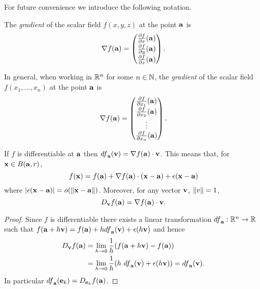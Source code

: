 For future convenience we introduce the following notation.
%
\begin{definition}[gradient]
    The \emph{gradient} of the scalar field \(f(x,y,z)\) at the point \(\aa\) is
    \[
        \nabla f(\aa) =
        \begin{pmatrix}
            \frac{\partial f}{\partial x}(\aa) \\[2pt]
            \frac{\partial f}{\partial y}(\aa) \\[2pt]
            \frac{\partial f}{\partial z}(\aa)
        \end{pmatrix}.
    \]
\end{definition}
%
\noindent
In general, when working in \(\bR^n\) for some \(n\in\bN\), the \emph{gradient} of the scalar field \(f(x_1,\ldots,x_n)\) at the point \(\aa\) is
\[
    \nabla f(\aa) =
    \begin{pmatrix}
        \frac{\partial f}{\partial x_1}(\aa) \\[2pt]
        \frac{\partial f}{\partial x_2}(\aa) \\[2pt]
        \vdots                               \\
        \frac{\partial f}{\partial x_n}(\aa)
    \end{pmatrix}.
\]


\begin{theorem}%
    \label{thm:differential}
    If \(f\) is differentiable at \(\aa\)
    then \({df}_{\aa}(\vv) = \nabla f(\aa) \cdot \vv \).
    This means that, for \(\xx \in B(\aa,r)\),
    \[
        f(\xx) = f(\aa) +   \nabla f(\aa) \cdot (\xx-\aa) + \epsilon(\xx-\aa)
    \]
    where \(\abs{\epsilon(\xx-\aa)} = \littleo{\norm{\xx-\aa}}\).
    Moreover, for any vector \(\vv\), \(\norm{v}=1\),
    \[
        D_{\vv}f(\aa) = \nabla f(\aa) \cdot \vv.
    \]
\end{theorem}

\begin{proof}
    Since \(f\) is differentiable there exists a linear transformation \({df}_{\aa}: \bR^n \to \bR\) such that
    \(  f(\aa+ h \vv) = f(\aa) + h {df}_{\aa}(\vv) + \epsilon(h\vv)\)
    and hence
    \[
        \begin{aligned}
            D_{\vv}f(\aa) & =
            \lim_{h\to 0} \frac{1}{h}(f(\aa+h \vv) - f(\aa)) \\
                          & =
            \lim_{h\to 0} \frac{1}{h}(h \ {df}_{\aa}(\vv) + \epsilon(h\vv) )
            =  {df}_{\aa}(\vv).
        \end{aligned}
    \]
    In particular \({df}_{\aa}(\ee_k) = D_{\ee_k}f(\aa)\).
\end{proof}


